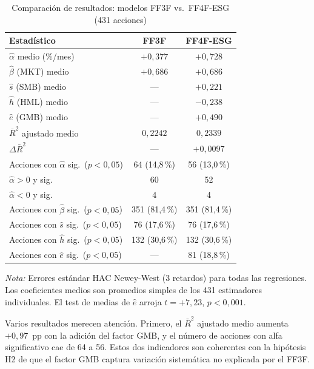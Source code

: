 \documentclass[12pt, a4paper]{article}
\begin{document}
\begin{table}[H]
  \centering
  \caption{Comparaci\'on de resultados: modelos FF3F vs.\ FF4F-ESG (431 acciones)}
  \label{tab:comparacion}
  \begin{tabular}{lcc}
    \toprule
    Estad\'istico & FF3F & FF4F-ESG \\
    \midrule
    $\hat\alpha$ medio (\%/mes)           & $+0{,}377$ & $+0{,}728$ \\
    $\hat\beta$ (MKT) medio               & $+0{,}686$ & $+0{,}686$ \\
    $\hat{s}$ (SMB) medio                 & ---         & $+0{,}221$ \\
    $\hat{h}$ (HML) medio                 & ---         & $-0{,}238$ \\
    $\hat{e}$ (GMB) medio                 & ---         & $+0{,}490$ \\
    $\bar{R}^2$ ajustado medio            & $0{,}2242$  & $0{,}2339$ \\
    $\Delta\bar{R}^2$                     & ---         & $+0{,}0097$ \\
    \midrule
    Acciones con $\hat\alpha$ sig.\ ($p<0{,}05$) & 64 (14{,}8\,\%) & 56 (13{,}0\,\%) \\
    \quad $\hat\alpha > 0$ y sig.          & 60 & 52 \\
    \quad $\hat\alpha < 0$ y sig.          & 4  & 4  \\
    Acciones con $\hat\beta$ sig.\ ($p<0{,}05$) & 351 (81{,}4\,\%) & 351 (81{,}4\,\%) \\
    Acciones con $\hat{s}$ sig.\ ($p<0{,}05$)   & 76 (17{,}6\,\%)  & 76 (17{,}6\,\%) \\
    Acciones con $\hat{h}$ sig.\ ($p<0{,}05$)   & 132 (30{,}6\,\%) & 132 (30{,}6\,\%) \\
    Acciones con $\hat{e}$ sig.\ ($p<0{,}05$)   & ---              & 81 (18{,}8\,\%) \\
    \bottomrule
  \end{tabular}
  \begin{minipage}{\linewidth}
    \small\vspace{0.3em}
    \textit{Nota:} Errores est\'andar HAC Newey-West (3 retardos) para todas las
    regresiones. Los coeficientes medios son promedios simples de los 431 estimadores
    individuales. El test de medias de $\hat{e}$ arroja $t = +7{,}23$, $p < 0{,}001$.
  \end{minipage}
\end{table}

Varios resultados merecen atenci\'on. Primero, el $\bar{R}^2$ ajustado medio aumenta
$+0{,}97$~pp con la adici\'on del factor GMB, y el n\'umero de acciones con alfa
significativo cae de 64 a 56. Estos dos indicadores son coherentes con la hip\'otesis
H2 de que el factor GMB captura variaci\'on sistem\'atica no explicada por el FF3F.
\end{document}
